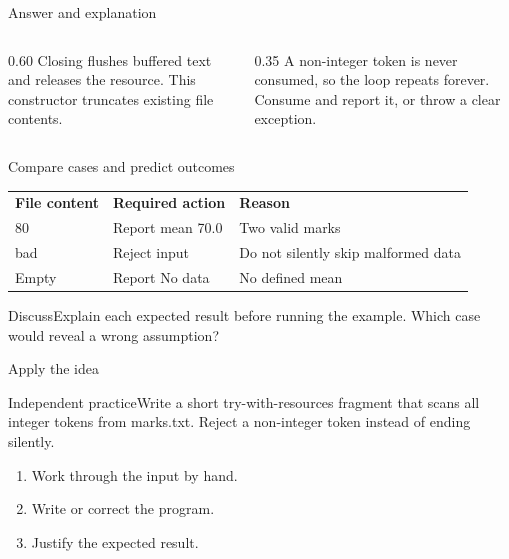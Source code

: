 \documentclass[10pt,aspectratio=169]{beamer}
\begin{document}
\begin{frame}[fragile,t]{Answer and explanation}
\begin{columns}[T,onlytextwidth]\begin{column}{0.60\textwidth}
Closing flushes buffered text and releases the resource. This constructor truncates existing file contents.
\end{column}\begin{column}{0.35\textwidth}\small
A non-integer token is never consumed, so the loop repeats forever. Consume and report it, or throw a clear exception.
\end{column}\end{columns}
\end{frame}


\begin{frame}[fragile,t]{Compare cases and predict outcomes}
\small\renewcommand{\arraystretch}{1.5}
\begin{tabularx}{\textwidth}{>{\raggedright\arraybackslash}X>{\raggedright\arraybackslash}X>{\raggedright\arraybackslash}X}\rowcolor{navy}
\color{white}\bfseries File content & \color{white}\bfseries Required action & \color{white}\bfseries Reason\\
60 80 & Report mean 70.0 & Two valid marks\\
60 bad & Reject input & Do not silently skip malformed data\\
Empty & Report No data & No defined mean\\
\end{tabularx}\par\vspace{3mm}\begin{exampleblock}{Discuss}Explain each expected result before running the example. Which case would reveal a wrong assumption?\end{exampleblock}
\end{frame}

\begin{frame}[fragile,t]{Apply the idea}
\begin{alertblock}{Independent practice}Write a short try-with-resources fragment that scans all integer tokens from marks.txt. Reject a non-integer token instead of ending silently.\end{alertblock}\vspace{3mm}\begin{enumerate}\item Work through the input by hand.\item Write or correct the program.\item Justify the expected result.\end{enumerate}
\end{frame}
\end{document}
